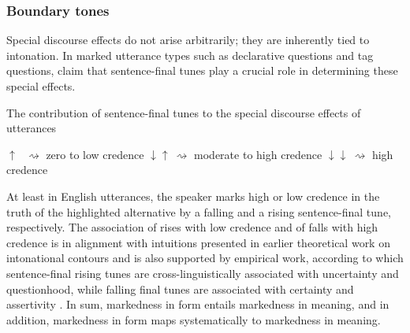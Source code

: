 \documentclass[output=paper,colorlinks,citecolor=brown            ,chinesefont]{langscibook}
\begin{document}
\subsubsection{Boundary tones}
\label{subsec:boundary}

Special discourse effects do not arise arbitrarily; they are inherently tied to intonation. In marked utterance types such as declarative questions and tag questions, \citet{Farkas+2017} claim that sentence-final tunes play a crucial role in determining these special effects.

\begin{exe}
\ex\label{intonation} The contribution of sentence-final tunes to the special discourse effects of utterances
\begin{xlist}
\ex\label{intonation1} $\uparrow \: \: \: \rightsquigarrow$ zero to low credence
\ex\label{intonation2} $\downarrow \uparrow \: \rightsquigarrow$ moderate to high credence
\ex\label{intonation3} $\downarrow \downarrow \: \rightsquigarrow$ high credence \hfill  \citep[272]{Farkas+2017}
\end{xlist}
\end{exe}

At least in English utterances, the speaker marks high or low credence in the truth of the highlighted alternative by a falling and a rising sentence-final tune, respectively. The association of rises with low credence and of falls with high credence is in alignment with intuitions presented in earlier theoretical work on intonational contours and is also supported by empirical work, according to which sentence-final rising tunes are cross-linguistically associated with uncertainty and questionhood, while falling final tunes are associated with certainty and assertivity \citep{Pierrehumbert+1990, Gussenhoven+2000, Gussenhoven2004}. In sum, markedness in form entails markedness in meaning, and in addition, markedness in form maps systematically to markedness in meaning.

\end{document}
